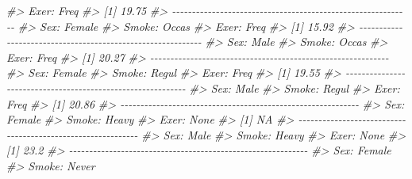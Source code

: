 \documentclass[
]{book}
\newenvironment{Shaded}{\begin{snugshade}}{\end{snugshade}}
\newcommand{\CommentTok}[1]{\textcolor[rgb]{0.56,0.35,0.01}{\textit{#1}}}
\begin{document}
\begin{Shaded}
\begin{Highlighting}[]
\CommentTok{\#\textgreater{} Exer: Freq}
\CommentTok{\#\textgreater{} [1] 19.75}
\CommentTok{\#\textgreater{} {-}{-}{-}{-}{-}{-}{-}{-}{-}{-}{-}{-}{-}{-}{-}{-}{-}{-}{-}{-}{-}{-}{-}{-}{-}{-}{-}{-}{-}{-}{-}{-}{-}{-}{-}{-}{-}{-}{-}{-}{-}{-}{-}{-}{-}{-}{-}{-}{-}{-}{-}{-}{-}{-}{-}{-}{-}{-}{-}{-} }
\CommentTok{\#\textgreater{} Sex: Female}
\CommentTok{\#\textgreater{} Smoke: Occas}
\CommentTok{\#\textgreater{} Exer: Freq}
\CommentTok{\#\textgreater{} [1] 15.92}
\CommentTok{\#\textgreater{} {-}{-}{-}{-}{-}{-}{-}{-}{-}{-}{-}{-}{-}{-}{-}{-}{-}{-}{-}{-}{-}{-}{-}{-}{-}{-}{-}{-}{-}{-}{-}{-}{-}{-}{-}{-}{-}{-}{-}{-}{-}{-}{-}{-}{-}{-}{-}{-}{-}{-}{-}{-}{-}{-}{-}{-}{-}{-}{-}{-} }
\CommentTok{\#\textgreater{} Sex: Male}
\CommentTok{\#\textgreater{} Smoke: Occas}
\CommentTok{\#\textgreater{} Exer: Freq}
\CommentTok{\#\textgreater{} [1] 20.27}
\CommentTok{\#\textgreater{} {-}{-}{-}{-}{-}{-}{-}{-}{-}{-}{-}{-}{-}{-}{-}{-}{-}{-}{-}{-}{-}{-}{-}{-}{-}{-}{-}{-}{-}{-}{-}{-}{-}{-}{-}{-}{-}{-}{-}{-}{-}{-}{-}{-}{-}{-}{-}{-}{-}{-}{-}{-}{-}{-}{-}{-}{-}{-}{-}{-} }
\CommentTok{\#\textgreater{} Sex: Female}
\CommentTok{\#\textgreater{} Smoke: Regul}
\CommentTok{\#\textgreater{} Exer: Freq}
\CommentTok{\#\textgreater{} [1] 19.55}
\CommentTok{\#\textgreater{} {-}{-}{-}{-}{-}{-}{-}{-}{-}{-}{-}{-}{-}{-}{-}{-}{-}{-}{-}{-}{-}{-}{-}{-}{-}{-}{-}{-}{-}{-}{-}{-}{-}{-}{-}{-}{-}{-}{-}{-}{-}{-}{-}{-}{-}{-}{-}{-}{-}{-}{-}{-}{-}{-}{-}{-}{-}{-}{-}{-} }
\CommentTok{\#\textgreater{} Sex: Male}
\CommentTok{\#\textgreater{} Smoke: Regul}
\CommentTok{\#\textgreater{} Exer: Freq}
\CommentTok{\#\textgreater{} [1] 20.86}
\CommentTok{\#\textgreater{} {-}{-}{-}{-}{-}{-}{-}{-}{-}{-}{-}{-}{-}{-}{-}{-}{-}{-}{-}{-}{-}{-}{-}{-}{-}{-}{-}{-}{-}{-}{-}{-}{-}{-}{-}{-}{-}{-}{-}{-}{-}{-}{-}{-}{-}{-}{-}{-}{-}{-}{-}{-}{-}{-}{-}{-}{-}{-}{-}{-} }
\CommentTok{\#\textgreater{} Sex: Female}
\CommentTok{\#\textgreater{} Smoke: Heavy}
\CommentTok{\#\textgreater{} Exer: None}
\CommentTok{\#\textgreater{} [1] NA}
\CommentTok{\#\textgreater{} {-}{-}{-}{-}{-}{-}{-}{-}{-}{-}{-}{-}{-}{-}{-}{-}{-}{-}{-}{-}{-}{-}{-}{-}{-}{-}{-}{-}{-}{-}{-}{-}{-}{-}{-}{-}{-}{-}{-}{-}{-}{-}{-}{-}{-}{-}{-}{-}{-}{-}{-}{-}{-}{-}{-}{-}{-}{-}{-}{-} }
\CommentTok{\#\textgreater{} Sex: Male}
\CommentTok{\#\textgreater{} Smoke: Heavy}
\CommentTok{\#\textgreater{} Exer: None}
\CommentTok{\#\textgreater{} [1] 23.2}
\CommentTok{\#\textgreater{} {-}{-}{-}{-}{-}{-}{-}{-}{-}{-}{-}{-}{-}{-}{-}{-}{-}{-}{-}{-}{-}{-}{-}{-}{-}{-}{-}{-}{-}{-}{-}{-}{-}{-}{-}{-}{-}{-}{-}{-}{-}{-}{-}{-}{-}{-}{-}{-}{-}{-}{-}{-}{-}{-}{-}{-}{-}{-}{-}{-} }
\CommentTok{\#\textgreater{} Sex: Female}
\CommentTok{\#\textgreater{} Smoke: Never}

\end{Highlighting}
\end{Shaded}
\end{document}
